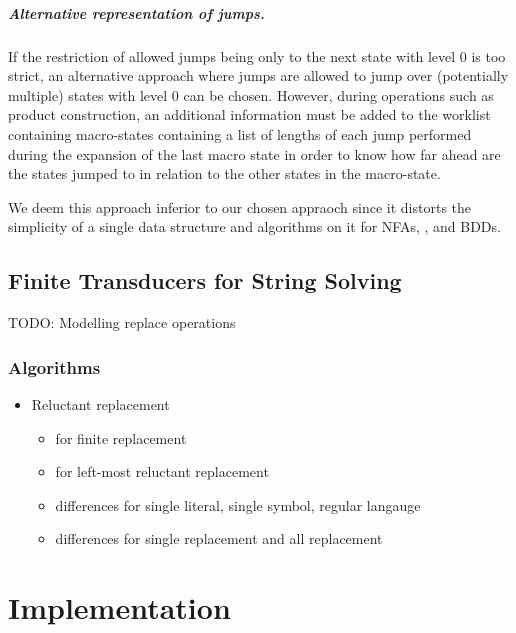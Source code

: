 \paragraph{Alternative representation of jumps.}
If the restriction of allowed jumps being only to the next state with level $0$ is too strict, an alternative approach where jumps are allowed to jump over (potentially multiple) states with level $0$ can be chosen.
However, during operations such as product construction, an additional information must be added to the worklist containing macro-states containing a list of lengths of each jump performed during the expansion of the last macro state in order to know how far ahead are the states jumped to in relation to the other states in the macro-state.

We deem this approach inferior to our chosen appraoch since it distorts the simplicity of a single data structure and algorithms on it for NFAs, \nfts, and BDDs.


\section{Finite Transducers for String Solving}

TODO: Modelling replace operations

\subsection{Algorithms}
\begin{itemize}
  \item Reluctant replacement~\cite{replace_nfts_model_ModelingRegularReplacementForStringConstraintSolving_DBLP:conf/nfm/FuL10}
  \begin{itemize}
    \item \dfts for finite replacement
    \item \nfts for left-most reluctant replacement
    \item differences for single literal, single symbol, regular langauge
    \item differences for single replacement and all replacement
  \end{itemize}
\end{itemize}

\chapter{Implementation}

